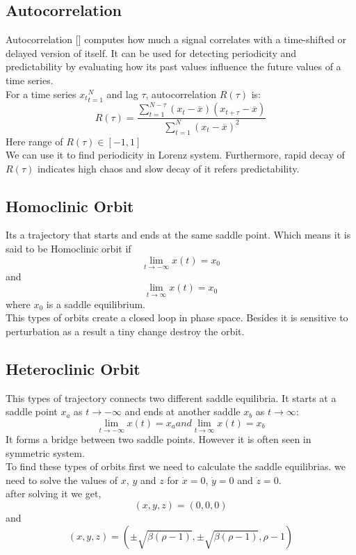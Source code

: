 \documentclass[%
 reprint,
 amsmath,amssymb,
 aps,
 floatfix,
]{revtex4-2}
\begin{document}
\subsection{Autocorrelation}
Autocorrelation [] computes how much a signal correlates with a time-shifted or delayed version of  itself. It can be used for detecting periodicity and predictability by evaluating how its past values influence the future values of a time series.\\
For a time series ${x_t}_{t=1}^N$ and lag $\tau$, autocorrelation $R(\tau)$ is:
\begin{equation}
	R(\tau) = \frac{\sum_{t=1}^{N-\tau} (x_t - \overline{x}) (x_{t+\tau} - \overline{x})}{\sum_{t=1}^{N} (x_t - \overline{x})^2}
\end{equation}
Here range of $R(\tau) \in [-1,1]$ \\
We can use it to find periodicity in Lorenz system. Furthermore, rapid decay of $R(\tau)$ indicates high chaos and slow decay of it refers predictability.\\
\subsection{Homoclinic Orbit}
Its a trajectory that starts and ends at the same saddle point.
Which means it is said to be Homoclinic orbit if\\
\begin{equation}
	\lim_{t\to -\infty} x(t) = x_0
\end{equation}
and
\begin{equation}
	\lim_{t\to \infty} x(t) = x_0
\end{equation}
where $x_0$ is a saddle equilibrium.\\
This types of orbits create a closed loop in phase space. Besides it is sensitive to perturbation as a result a tiny change destroy the orbit.
\subsection{Heteroclinic Orbit}
This types of trajectory connects two different saddle equilibria. It starts at a saddle point $x_a$ as $t\to-\infty$ and ends at another saddle $x_b$ as $t\to\infty$:
\begin{equation}
	\lim_{t\to-\infty}x(t)= x_a	  and   \lim_{t\to\infty}x(t)= x_b
\end{equation}
It forms a bridge between two saddle points. However it is often seen in symmetric system.\\
To find these types of orbits first we need to calculate the saddle equilibrias. we need to solve the values of $x$, $y$ and $z$ for $\dot{x}=0$, $\dot{y}=0$ and $\dot{z}=0$.\\
after solving it we get,\\
\begin{equation}
	(x,y,z) = (0,0,0)
\end{equation}
and
\begin{equation}
	(x,y,z) = (\pm \sqrt{\beta(\rho -1)}, \pm \sqrt{\beta(\rho -1)}, \rho -1)
\end{equation}
\end{document}
